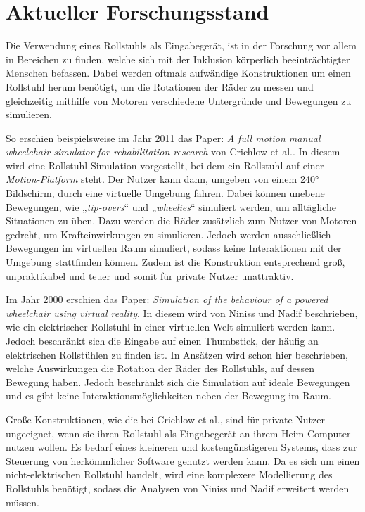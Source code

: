 \chapter{Aktueller Forschungsstand}
Die Verwendung eines Rollstuhls als Eingabegerät, ist in der Forschung vor allem in Bereichen zu finden, welche sich mit der Inklusion körperlich beeinträchtigter Menschen befassen.
Dabei werden oftmals aufwändige Konstruktionen um einen Rollstuhl herum benötigt, um die Rotationen der Räder zu messen und gleichzeitig mithilfe von Motoren verschiedene Untergründe und Bewegungen zu simulieren.

So erschien beispielsweise im Jahr 2011 das Paper: \textit{A full motion manual\\wheelchair simulator for rehabilitation research} von Crichlow et al.\cite{crichlowFullMotionManual2011}.
In diesem wird eine Rollstuhl-Simulation vorgestellt, bei dem ein Rollstuhl auf einer \textit{Motion-Platform} steht.
Der Nutzer kann dann, umgeben von einem 240° Bildschirm, durch eine virtuelle Umgebung fahren.
Dabei können unebene Bewegungen, wie „\textit{tip-overs}“ und „\textit{wheelies}“ simuliert werden, um alltägliche Situationen zu üben\cite{crichlowFullMotionManual2011}.
Dazu werden die Räder zusätzlich zum Nutzer von Motoren gedreht, um Krafteinwirkungen zu simulieren.
Jedoch werden ausschließlich Bewegungen im virtuellen Raum simuliert, sodass keine Interaktionen mit der Umgebung stattfinden können.
Zudem ist die Konstruktion entsprechend groß, unpraktikabel und teuer und somit für private Nutzer unattraktiv.

Im Jahr 2000 erschien das Paper: \textit{Simulation of the behaviour of a powered wheelchair using virtual reality}\cite{ninissSimulationBehaviourPowered2000}.
In diesem wird von Niniss und Nadif beschrieben, wie ein elektrischer Rollstuhl in einer virtuellen Welt simuliert werden kann.
Jedoch beschränkt sich die Eingabe auf einen Thumbstick, der häufig an elektrischen Rollstühlen zu finden ist.
In Ansätzen wird schon hier beschrieben, welche Auswirkungen die Rotation der Räder des Rollstuhls, auf dessen Bewegung haben.
Jedoch beschränkt sich die Simulation auf ideale Bewegungen und es gibt keine Interaktionsmöglichkeiten neben der Bewegung im Raum.

Große Konstruktionen, wie die bei Crichlow et al., sind für private Nutzer ungeeignet, wenn sie ihren Rollstuhl als Eingabegerät an ihrem Heim-Computer nutzen wollen.
Es bedarf eines kleineren und kostengünstigeren Systems, dass zur Steuerung von herkömmlicher Software genutzt werden kann.
Da es sich um einen nicht-elektrischen Rollstuhl handelt, wird eine komplexere Modellierung des Rollstuhls benötigt, sodass die Analysen von Niniss und Nadif erweitert werden müssen.